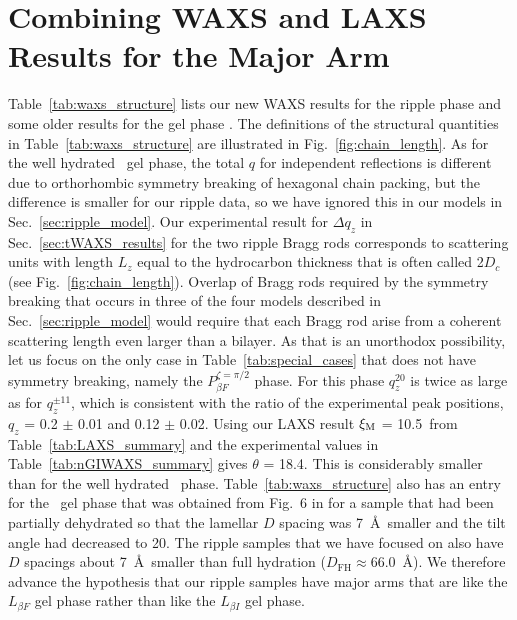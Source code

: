 \section{Combining WAXS and LAXS Results for the Major Arm}\label{sec:waxs_results}
Table~\ref{tab:waxs_structure} lists our new WAXS results for the ripple phase 
and some older results for the gel phase \cite{Tristram-Nagle02}. The definitions
of the structural quantities in Table~\ref{tab:waxs_structure} are illustrated
in Fig.~\ref{fig:chain_length}. As for the 
well hydrated \LbetaI\ gel phase, the total $q$ for independent 
reflections is different due to orthorhombic symmetry breaking of hexagonal 
chain packing, but the difference is smaller for our ripple data, so we have 
ignored this in our models in Sec.~\ref{sec:ripple_model}.  
Our experimental result for ${\Delta}q_z$ in Sec.~\ref{sec:tWAXS_results} for the two ripple Bragg 
rods corresponds to scattering units with length $L_z$ equal to the hydrocarbon 
thickness that is often called 2$D_c$ (see Fig.~\ref{fig:chain_length}). 
Overlap of Bragg rods required by the 
symmetry breaking that occurs in three of the four models described 
in Sec.~\ref{sec:ripple_model} would require that each Bragg rod arise from a coherent scattering 
length even larger than a bilayer. As that is an unorthodox possibility, let 
us focus on the only case in Table~\ref{tab:special_cases} that does not have 
symmetry breaking, namely the $P_{\beta F}^{\zeta=\pi/2}$ phase. For this 
phase $q_z^{20}$ is twice as large as for $q_z^{{\pm}11}$,
which is consistent with the ratio of the experimental peak 
positions, $q_z$ = 0.2 $\pm$ 0.01 and 0.12 $\pm$ 0.02. 
Using our LAXS result $\xi_\text{M}$ = 10.5\textdegree\ from Table~\ref{tab:LAXS_summary} 
and the experimental values in Table~\ref{tab:nGIWAXS_summary} gives 
$\theta$ = 18.4\textdegree. This is considerably smaller than for the well 
hydrated \LbetaI\ phase. Table~\ref{tab:waxs_structure} also has an entry 
for the \LbetaF\ gel phase that was obtained from Fig.~6 in \cite{Tristram-Nagle02} for a 
sample that had been partially dehydrated so that the lamellar $D$ spacing was 
7~\AA\ smaller and the tilt angle had decreased to 20\textdegree. The ripple 
samples that we have focused on also have $D$ spacings about 7~\AA\ smaller 
than full hydration ($D_\text{FH}\approx 66.0$~\AA \cite{ref:Zhang95}).  
We therefore advance the 
hypothesis that our ripple samples have major arms that are like the 
$L_{\beta F}$ gel phase rather than like the $L_{\beta I}$ gel phase.

